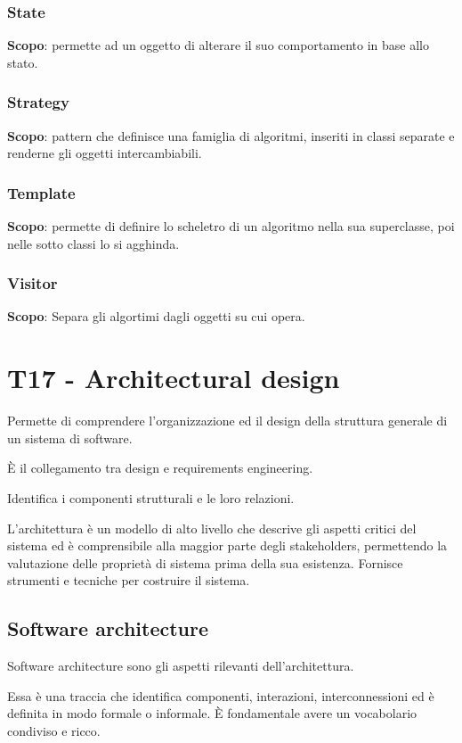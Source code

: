 \documentclass{article}
\begin{document}
\subsubsection{State}
\textbf{Scopo}: permette ad un oggetto di alterare il suo comportamento in base allo stato.

\subsubsection{Strategy}
\textbf{Scopo}: pattern che definisce una famiglia di algoritmi, inseriti in classi
separate e renderne gli oggetti intercambiabili.

\subsubsection{Template}
\textbf{Scopo}: permette di definire lo scheletro di un algoritmo nella sua superclasse,
poi nelle sotto classi lo si agghinda.

\subsubsection{Visitor}
\textbf{Scopo}: Separa gli algortimi dagli oggetti su cui opera.

\section{T17 - Architectural design}
Permette di comprendere l'organizzazione ed il design della struttura generale
di un sistema di software.

È il collegamento tra design e requirements engineering.

Identifica i componenti strutturali e le loro relazioni.

L'architettura è un modello di alto livello che descrive gli aspetti critici del
sistema ed è comprensibile alla maggior parte degli stakeholders, permettendo la valutazione delle proprietà
di sistema prima della sua esistenza. Fornisce strumenti e tecniche per costruire il sistema.

\subsection{Software architecture}

Software architecture sono gli aspetti rilevanti dell'architettura.

Essa è una traccia che identifica
componenti, interazioni, interconnessioni ed è definita in modo formale o informale. È fondamentale avere
un vocabolario condiviso e ricco.
\end{document}
